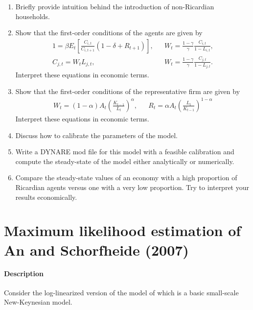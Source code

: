 \documentclass{article}
\begin{document}
\begin{enumerate}

\item Briefly provide intuition behind the introduction of non-Ricardian households.

\item Show that the first-order conditions of the agents are given by
\begin{align*}
1 = \beta E_t\left[ \frac{C_{i,t}}{C_{i,t+1}} \left(1-\delta + R_{t+1}\right)\right],
&&
W_t = \frac{1-\gamma}{\gamma} \frac{C_{i,t}}{1-L_{i,t}},
\\
C_{j,t} = W_t L_{j,t},
&&
W_t = \frac{1-\gamma}{\gamma} \frac{C_{j,t}}{1-L_{j,t}}.
\end{align*}
Interpret these equations in economic terms.

\item Show that the first-order conditions of the representative firm are given by
\begin{align*}
W_t = (1-\alpha) A_t \left(\frac{K_{t-1}}{L_t}\right)^\alpha, &&	R_t = \alpha A_t \left(\frac{L_t}{K_{t-1}}\right)^{1-\alpha}
\end{align*}
Interpret these equations in economic terms.

\item Discuss how to calibrate the parameters of the model.

\item Write a DYNARE mod file for this model with a feasible calibration
  and compute the steady-state of the model either analytically or numerically.

\item Compare the steady-state values of an economy with a high proportion of Ricardian agents versus one with a very low proportion.
Try to interpret your results economically.
\end{enumerate}

\newpage

\section[Maximum likelihood estimation of An and Schorfheide (2007)]{Maximum likelihood estimation of An and Schorfheide (2007)\label{ex:AnSchorfheide2007ML}}
\paragraph{Description}
Consider the log-linearized version of the model of \textcite{An.Schorfheide_2007_BayesianAnalysisDSGE}
  which is a basic small-scale New-Keynesian model.
\end{document}
